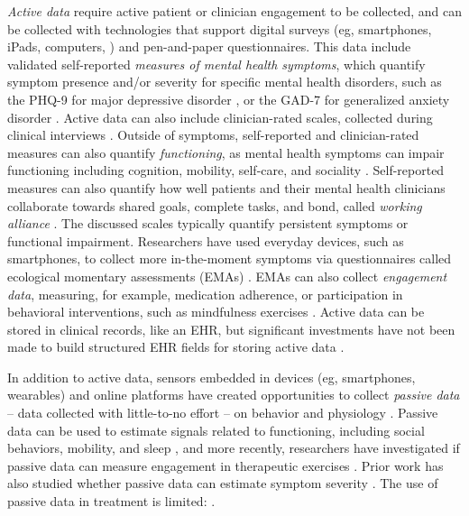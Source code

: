 \textit{Active data} require active patient or clinician engagement to be collected, and can be collected with technologies that support digital surveys (eg, smartphones, iPads, computers, ) and pen-and-paper questionnaires.
This data include validated self-reported \textit{measures of mental health symptoms}, which quantify symptom presence and/or severity for specific mental health disorders, such as the PHQ-9 for major depressive disorder \cite{kroenke_phq-9_2001}, or the GAD-7 for generalized anxiety disorder \cite{spitzer_brief_2006}.
Active data can also include clinician-rated scales, collected during clinical interviews \cite{andersen_brief_1986}.
Outside of symptoms, self-reported and clinician-rated measures can also quantify \textit{functioning}, as mental health symptoms can impair functioning including cognition, mobility, self-care, and sociality \cite{ustun_measuring_2010}. 
Self-reported measures can also quantify how well patients and their mental health clinicians collaborate towards shared goals, complete tasks, and bond, called \textit{working alliance} \cite{hatcher_development_2006}.
The discussed scales typically quantify persistent symptoms or functional impairment.
Researchers have used everyday devices, such as smartphones, to collect more in-the-moment symptoms via questionnaires called ecological momentary assessments (EMAs) \cite{wang_crosscheck_2016, hsieh_using_2008}.
EMAs can also collect \textit{engagement data}, measuring, for example, medication adherence, or participation in behavioral interventions, such as mindfulness exercises \cite{militello_digital_2022, klasnja_how_2011}.
Active data can be stored in clinical records, like an EHR, but significant investments have not been made to build structured EHR fields for storing active data \cite{pincus_quality_2016}.

In addition to active data, sensors embedded in devices (eg, smartphones, wearables) and online platforms have created opportunities to collect \textit{passive data} -- data collected with little-to-no effort -- on behavior and physiology \cite{nghiem_understanding_2023}.
Passive data can be used to estimate signals related to functioning, including social behaviors, mobility, and sleep \cite{mohr_personal_2017, saeb_relationship_2016, saeb_scalable_2017}, and more recently, researchers have investigated if passive data can measure engagement in therapeutic exercises \cite{evans_using_2024}.
Prior work has also studied whether passive data can estimate symptom severity \cite{adler_measuring_2024, das_swain_semantic_2022, meyerhoff_evaluation_2021, currey_digital_2022}.
The use of passive data in treatment is limited: .

